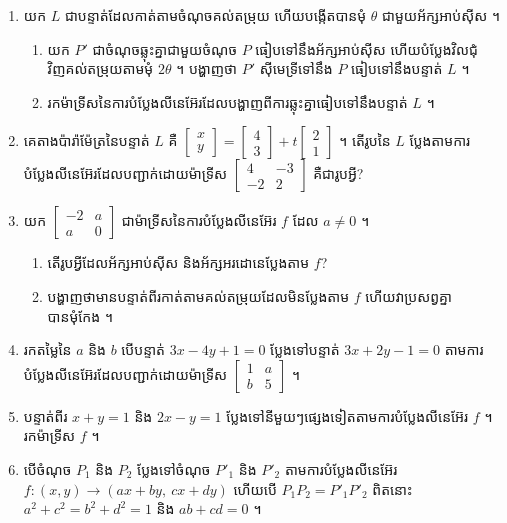 \begin{enumerate}[1]
  \item យក $L$ ជាបន្ទាត់ដែលកាត់តាមចំណុចគល់តម្រុយ ហើយបង្កើតបានមុំ $\theta$ ជាមួយអ័ក្សអាប់ស៊ីស ។
  \begin{enumerate}[a]
    \item យក $P'$ ជាចំណុចឆ្លុះគ្នាជាមួយចំណុច $P$ ធៀបទៅនឹងអ័ក្សអាប់ស៊ីស ហើយបំប្លែងវិលជុំវិញគល់តម្រុយតាមមុំ $2\theta$ ។ បង្ហាញថា $P'$ ស៊ីមេទ្រីទៅនឹង $P$ ធៀបទៅនឹងបន្ទាត់ $L$ ។
    \item រកម៉ាទ្រីសនៃការបំប្លែងលីនេអ៊ែរដែលបង្ហាញពីការឆ្លុះគ្នាធៀបទៅនឹងបន្ទាត់ $L$ ។
  \end{enumerate}
  \item គេតាងប៉ារ៉ាម៉ែត្រនៃបន្ទាត់ $L$ គឺ $\begin{bmatrix} x\\ y \end{bmatrix} = \begin{bmatrix} 4\\ 3 \end{bmatrix} + t\begin{bmatrix} 2\\ 1 \end{bmatrix}$ ។ តើរូបនៃ $L$ ប្លែងតាមការបំប្លែងលីនេអ៊ែរដែលបញ្ជាក់ដោយម៉ាទ្រីស $\begin{bmatrix} 4 & -3\\ -2 & 2 \end{bmatrix}$ គឺជារូបអ្វី?
  \item យក $\begin{bmatrix} -2 & a\\ a & 0 \end{bmatrix}$ ជាម៉ាទ្រីសនៃការបំប្លែងលីនេអ៊ែរ $f$ ដែល $a \ne 0$ ។
  \begin{enumerate}[a]
    \item តើរូបអ្វីដែលអ័ក្សអាប់ស៊ីស និងអ័ក្សអរដោនេប្លែងតាម $f$?
    \item បង្ហាញថាមានបន្ទាត់ពីរកាត់តាមគល់តម្រុយដែលមិនប្លែងតាម $f$ ហើយវាប្រសព្វគ្នាបានមុំកែង ។
  \end{enumerate}
  \item រកតម្លៃនៃ $a$ និង $b$ បើបន្ទាត់ $3x - 4y + 1 = 0$ ប្លែងទៅបន្ទាត់ $3x + 2y - 1 = 0$ តាមការបំប្លែងលីនេអ៊ែរដែលបញ្ជាក់ដោយម៉ាទ្រីស $\begin{bmatrix} 1 & a\\ b & 5 \end{bmatrix}$ ។
  \item បន្ទាត់ពីរ $x + y = 1$ និង $2x - y = 1$ ប្លែងទៅនីមួយៗផ្សេងទៀតតាមការបំប្លែងលីនេអ៊ែរ $f$ ។ រកម៉ាទ្រីស $f$ ។
  \item បើចំណុច $P_1$ និង $P_2$ ប្លែងទៅចំណុច $P'_1$ និង $P'_2$ តាមការបំប្លែងលីនេអ៊ែរ $f : (x, y) \to (ax + by, \ cx + dy)$ ហើយបើ $P_1P_2 = P'_1P'_2$ ពិតនោះ $a^2 + c^2 = b^2 + d^2 = 1$ និង $ab + cd = 0$ ។

\end{enumerate}
